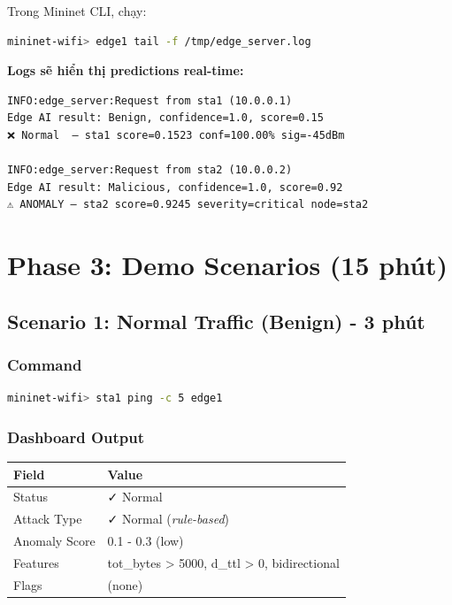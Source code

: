 \documentclass[12pt,a4paper]{article}
\begin{document}
Trong Mininet CLI, chạy:
\begin{lstlisting}[language=bash]
mininet-wifi> edge1 tail -f /tmp/edge_server.log
\end{lstlisting}

\textbf{Logs sẽ hiển thị predictions real-time:}
\begin{lstlisting}
INFO:edge_server:Request from sta1 (10.0.0.1)
Edge AI result: Benign, confidence=1.0, score=0.15
❌ Normal  — sta1 score=0.1523 conf=100.00% sig=-45dBm

INFO:edge_server:Request from sta2 (10.0.0.2)
Edge AI result: Malicious, confidence=1.0, score=0.92
⚠️ ANOMALY — sta2 score=0.9245 severity=critical node=sta2
\end{lstlisting}

\section{Phase 3: Demo Scenarios (15 phút)}

\subsection{Scenario 1: Normal Traffic (Benign) - 3 phút}

\subsubsection{Command}
\begin{lstlisting}[language=bash]
mininet-wifi> sta1 ping -c 5 edge1
\end{lstlisting}

\subsubsection{Dashboard Output}
\begin{table}[h]
\centering
\begin{tabularx}{\textwidth}{|l|X|}
\hline
\textbf{Field} & \textbf{Value} \\
\hline
Status & \color{green}✓ Normal \\
\hline
Attack Type & \color{green}✓ Normal (\textit{rule-based}) \\
\hline
Anomaly Score & 0.1 - 0.3 (low) \\
\hline
Features & tot\_bytes > 5000, d\_ttl > 0, bidirectional \\
\hline
Flags & (none) \\
\hline
\end{tabularx}
\end{table}
\end{document}
